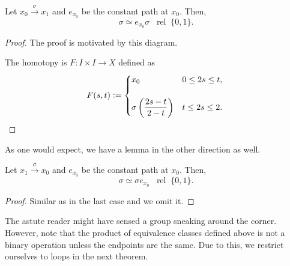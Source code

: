 \documentclass[12pt]{article}
\newcommand{\rel}{\;\;\operatorname{rel}\;}
\begin{document}
\begin{lem} \label{lem:leftid}
	Let $x_0 \overset{\sigma}{\longrightarrow} x_1$ and $e_{x_0}$ be the constant path at $x_0.$ Then,
	\begin{equation*} 
		\sigma \simeq e_{x_0}\sigma \rel \{0, 1\}.
	\end{equation*}
\end{lem}
\begin{proof} 
	The proof is motivated by this diagram.

	\begin{center}
	\end{center}

	The homotopy is $F:I\times I \to X$ defined as
	\begin{equation*} 
		F(s, t) \vcentcolon= \begin{cases}
			x_0 & 0 \le 2s \le t,\\~\\
    	\sigma\left(\dfrac{2s - t}{2 - t}\right) & t \le 2s \le 2.
		\end{cases}
		\qedhere
	\end{equation*}
\end{proof}

As one would expect, we have a lemma in the other direction as well.
\begin{lem} \label{lem:rightid}
	Let $x_1 \overset{\sigma}{\longrightarrow} x_0$ and $e_{x_0}$ be the constant path at $x_0.$ Then,
	\begin{equation*} 
		\sigma \simeq \sigma e_{x_0} \rel \{0, 1\}.
	\end{equation*}
\end{lem}

\begin{proof} 
	Similar as in the last case and we omit it.
\end{proof}
	
The astute reader might have sensed a group sneaking around the corner.\\
However, note that the product of equivalence classes defined above is not a binary operation unless the endpoints are the same. Due to this, we restrict ourselves to loops in the next theorem.
\end{document}
